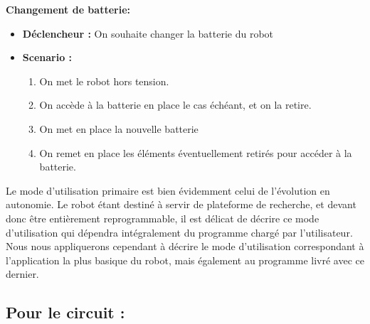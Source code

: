 	\textbf{Changement de batterie:}
	\begin{itemize}
		\item \textbf{Déclencheur :} On souhaite changer la batterie du robot
		\item \textbf{Scenario :}
		\begin{enumerate}
			\item On met le robot hors tension.
			\item On accède à la batterie en place le cas échéant, et on la retire.
			\item On met en place la nouvelle batterie
			\item On remet en place les éléments éventuellement retirés pour accéder à la batterie.
		\end{enumerate}
	\end{itemize}


	Le mode d'utilisation primaire est bien évidemment celui de l'évolution en autonomie. Le robot étant destiné à servir de plateforme de recherche, et devant donc être entièrement reprogrammable, il est délicat de décrire ce mode d'utilisation qui dépendra intégralement du programme chargé par l'utilisateur.\\

	Nous nous appliquerons cependant à décrire le mode d'utilisation correspondant à l'application la plus basique du robot, mais également au programme livré avec ce dernier.
\subsection{Pour le circuit :}

